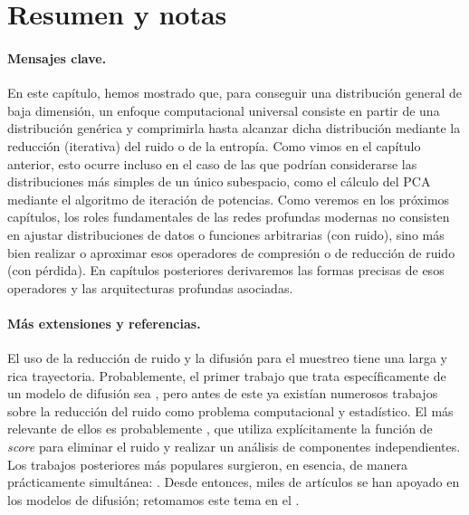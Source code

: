 \documentclass[../../book-main.tex]{subfiles}
\begin{document}
\section{Resumen y notas}
\paragraph{Mensajes clave.}
En este capítulo, hemos mostrado que, para conseguir una distribución general
de baja dimensión, un enfoque computacional universal consiste
en partir de una distribución genérica y comprimirla hasta alcanzar
dicha distribución mediante la reducción (iterativa) del ruido o de la entropía. Como
vimos en el capítulo anterior, esto ocurre incluso en el caso de
las que podrían considerarse las distribuciones más simples de un único subespacio, como
el cálculo del PCA mediante el algoritmo de iteración de potencias. Como veremos en
los próximos capítulos, los roles fundamentales de las redes profundas modernas
no consisten en ajustar distribuciones de datos o funciones arbitrarias (con ruido),
sino más bien realizar o aproximar esos operadores de compresión
o de reducción de ruido (con pérdida). En capítulos posteriores derivaremos las formas precisas de esos
operadores y las arquitecturas profundas asociadas.

\paragraph{Más extensiones y referencias.}
El uso de la reducción de ruido y la difusión para el muestreo tiene una larga y rica trayectoria.
Probablemente, el primer trabajo que trata específicamente de un modelo de difusión sea
\cite{Sohl-Dickstein2015}, pero antes de este ya existían numerosos trabajos sobre
la reducción del ruido como problema computacional y estadístico. El más
relevante de ellos es probablemente \cite{hyvarinen05a}, que utiliza explícitamente
la función de \textit{score} para eliminar el ruido y realizar un análisis de componentes 
independientes. Los trabajos posteriores más populares surgieron, en esencia,
de manera prácticamente simultánea: \cite{ho2020denoising,song2019}. Desde entonces, miles
de artículos se han apoyado en los modelos de difusión; retomamos este tema en el
.
\end{document}
